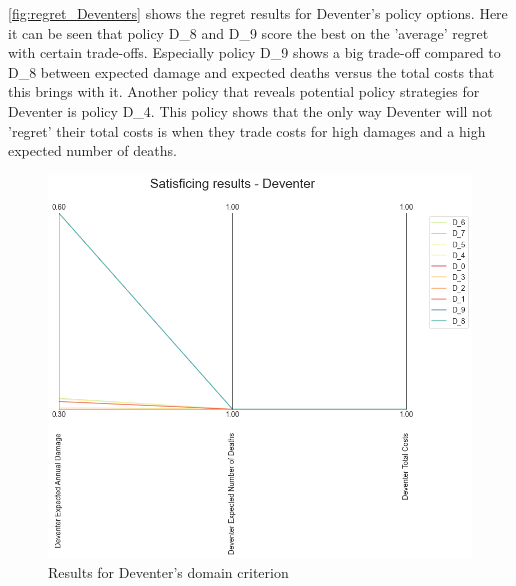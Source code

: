 \noindent \autoref{fig:regret_Deventers} shows the regret results for Deventer's policy options. Here it can be seen that policy D\_8 and D\_9 score the best on the 'average' regret with certain trade-offs. Especially policy D\_9 shows a big trade-off compared to D\_8 between expected damage and expected deaths versus the total costs that this brings with it. Another policy that reveals potential policy strategies for Deventer is policy D\_4. This policy shows that the only way Deventer will not 'regret' their total costs is when they trade costs for high damages and a high expected number of deaths. 
\begin{figure}[H]
  \centering
  \begin{minipage}[b]{0.4\textwidth}
    \includegraphics[width=1.2\textwidth]{report/figures/results/domain_criterion_Deventer.png}
    \caption{Results for Deventer's domain criterion}
    \label{fig:domain_criterion_Deventers}
  \end{minipage}
  \hfill
  \begin{minipage}[b]{0.4\textwidth}

\end{minipage}
\end{figure}
